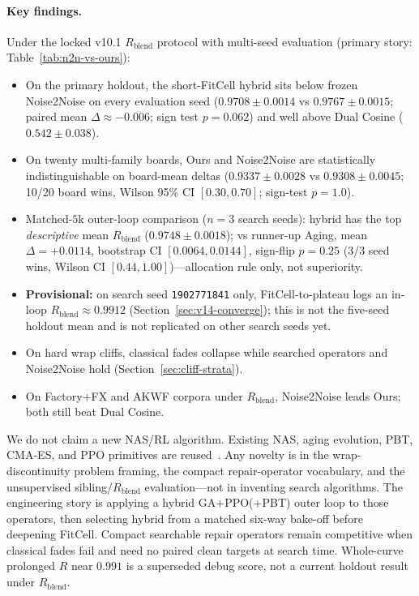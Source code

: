 \paragraph{Key findings.}
Under the locked v10.1 $R_{\mathrm{blend}}$ protocol with multi-seed evaluation (primary story: Table~\ref{tab:n2n-vs-ours}):
\begin{itemize}
  \item On the primary holdout, the short-FitCell hybrid sits below frozen Noise2Noise on every evaluation seed ($0.9708{\pm}0.0014$ vs $0.9767{\pm}0.0015$; paired mean $\Delta{\approx}{-}0.006$; sign test $p{=}0.062$) and well above Dual Cosine ($0.542{\pm}0.038$).
  \item On twenty multi-family boards, Ours and Noise2Noise are statistically indistinguishable on board-mean deltas ($0.9337{\pm}0.0028$ vs $0.9308{\pm}0.0045$; 10/20 board wins, Wilson 95\% CI $[0.30,0.70]$; sign-test $p{=}1.0$).
  \item Matched-$5$k outer-loop comparison ($n{=}3$ search seeds): hybrid has the top \emph{descriptive} mean $R_{\mathrm{blend}}$ ($0.9748{\pm}0.0018$); vs runner-up Aging, mean $\Delta{=}{+}0.0114$, bootstrap CI $[0.0064,0.0144]$, sign-flip $p{=}0.25$ (3/3 seed wins, Wilson CI $[0.44,1.00]$)---allocation rule only, not superiority.
  \item \textbf{Provisional:} on search seed \texttt{1902771841} only, FitCell-to-plateau logs an in-loop $R_{\mathrm{blend}}{\approx}0.9912$ (Section~\ref{sec:v14-converge}); this is not the five-seed holdout mean and is not replicated on other search seeds yet.
  \item On hard wrap cliffs, classical fades collapse while searched operators and Noise2Noise hold (Section~\ref{sec:cliff-strata}).
  \item On Factory+FX and AKWF corpora under $R_{\mathrm{blend}}$, Noise2Noise leads Ours; both still beat Dual Cosine.
\end{itemize}
We do not claim a new NAS/RL algorithm.
Existing NAS, aging evolution, PBT, CMA-ES, and PPO primitives are reused~\cite{elsken2019,real2019,jaderberg2017,schulman2017}.
Any novelty is in the wrap-discontinuity problem framing, the compact repair-operator vocabulary, and the unsupervised sibling/$R_{\mathrm{blend}}$ evaluation---not in inventing search algorithms.
The engineering story is applying a hybrid GA+PPO(+PBT) outer loop to those operators, then selecting hybrid from a matched six-way bake-off before deepening FitCell.
Compact searchable repair operators remain competitive when classical fades fail and need no paired clean targets at search time.
Whole-curve prolonged $R$ near $0.991$ is a superseded debug score, not a current holdout result under $R_{\mathrm{blend}}$.

